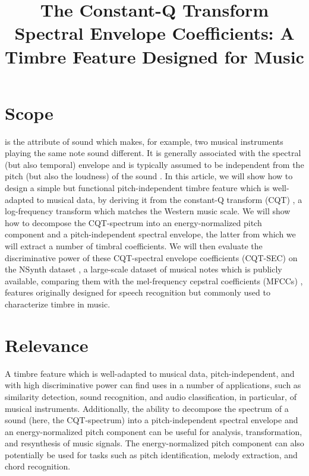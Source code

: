 \documentclass[journal]{IEEEtran}
\begin{document}
\title{The Constant-Q Transform Spectral Envelope Coefficients: A Timbre Feature Designed for Music}

\maketitle

\section{Scope}

 is the attribute of sound which makes, for example, two musical instruments playing the same note sound different. It is generally associated with the spectral (but also temporal) envelope and is typically assumed to be independent from the pitch (but also the loudness) of the sound \cite{moore2004}. In this article, we will show how to design a simple but functional pitch-independent timbre feature which is well-adapted to musical data, by deriving it from the constant-Q transform (CQT) \cite{brown1991, brown1992}, a log-frequency transform which matches the Western music scale. We will show how to decompose the CQT-spectrum into an energy-normalized pitch component and a pitch-independent spectral envelope, the latter from which we will extract a number of timbral coefficients. We will then evaluate the discriminative power of these CQT-spectral envelope coefficients (CQT-SEC) on the NSynth dataset \cite{engel2017}, a large-scale dataset of musical notes which is publicly available, comparing them with the mel-frequency cepstral coefficients (MFCCs) \cite{mermelstein1976}, features originally designed for speech recognition but commonly used to characterize timbre in music. 


\section{Relevance}

A timbre feature which is well-adapted to musical data, pitch-independent, and with high discriminative power can find uses in a number of applications, such as similarity detection, sound recognition, and audio classification, in particular, of musical instruments. Additionally, the ability to decompose the spectrum of a sound (here, the CQT-spectrum) into a pitch-independent spectral envelope and an energy-normalized pitch component can be useful for analysis, transformation, and resynthesis of music signals. The energy-normalized pitch component can also potentially be used for tasks such as pitch identification, melody extraction, and chord recognition.
\end{document}
